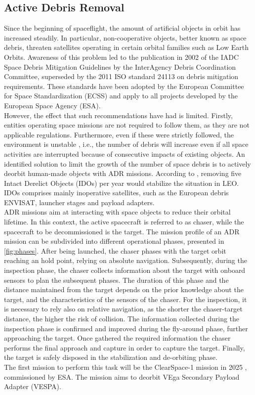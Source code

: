 \subsection{Active Debris Removal}
Since the beginning of spaceflight, the amount of artificial objects in orbit has increased steadily. In particular, non-cooperative objects, better known as space debris, threaten satellites operating in certain orbital families such as Low Earth Orbits. 
Awareness of this problem led to the publication in 2002 of the IADC Space Debris Mitigation Guidelines \cite{yakovlev2005iadc} by the InterAgency Debris Coordination Committee, superseded by the 2011 ISO standard 24113 \cite{ISO24113} on debris mitigation requirements. These standards have been adopted by the European Committee for Space Standardization (ECSS) and apply to all projects developed by the European Space Agency (ESA).\\
However, the effect that such recommendations have had is limited. Firstly, entities operating space missions are not required to follow them, as they are not applicable regulations.
Furthermore, even if these were strictly followed, the environment is unstable \cite{lemmens2020esa}, i.e., the number of debris will increase even if all space activities are interrupted because of consecutive impacts of existing objects. An identified solution to limit the growth of the number of space debris is to actively deorbit human-made objects with ADR missions. According to \cite{liou2012active}, removing five Intact Derelict Objects (IDOs) per year would stabilize the situation in LEO. IDOs comprises mainly inoperative satellites, such as the European debris ENVISAT, launcher stages and payload adapters.\\
ADR missions aim at interacting with space objects to reduce their orbital lifetime. In this context, the active spacecraft is referred to as chaser, while the spacecraft to be decommissioned is the target. The mission profile of an ADR mission can be subdivided into different operational phases, presented in \cref{fig:phases}. After being launched, the chaser phases with the target orbit reaching an hold point, relying on absolute navigation. Subsequently, during the inspection phase, the chaser collects information about the target with onboard sensors to plan the subsequent phases. The duration of this phase and the distance maintained from the target depends on the prior knowledge about the target, and the characteristics of the sensors of the chaser. For the inspection, it is necessary to rely also on relative navigation, as the shorter the chaser-target distance, the higher the risk of collision. The information collected during the inspection phase is confirmed and improved during the fly-around phase, further approaching the target. Once gathered the required information the chaser performs the final approach and capture in order to capture the target. Finally, the target is safely disposed in the stabilization and de-orbiting phase.\\
The first mission to perform this task will be the ClearSpace-1 mission in 2025 \cite{biesbroek2021clearspace}, commissioned by ESA. The mission aims to deorbit VEga Secondary Payload Adapter (VESPA). \\

